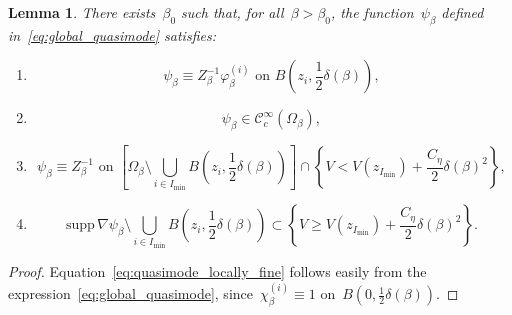 \documentclass[10pt]{article}
\newcommand{\1}{\mathbbm 1}
\newcommand{\supp}{\mathrm{supp}}
\newcommand{\largeRadius}{\delta}
\newcommand{\localCutoff}[1]{\chi_\beta^{(#1)}} %
\newcommand{\energyCutoffConst}{C_\eta}
\newtheorem{lemma}{Lemma}
\begin{document}
            \begin{lemma}
                \label{lemma:qm_energy_estimates}
                There exists~$\beta_0$ such that, for all~$\beta>\beta_0$, the function~$\psi_\beta$ defined in~\eqref{eq:global_quasimode} satisfies:
                \begin{enumerate}[]
                    \item{\begin{equation}\label{eq:quasimode_locally_fine}
                        \psi_\beta \equiv Z_\beta^{-1}\varphi_\beta^{(i)}\text{ on }B\left(z_i,\frac12\largeRadius(\beta)\right),
                    \end{equation}}
                    \item{\begin{equation}\label{eq:quasimode_smooth}
                        \psi_\beta \in \mathcal C_c^\infty(\Omega_\beta),
                    \end{equation}}
                    \item{\begin{equation}\label{eq:quasimode_flat}
                        \psi_\beta \equiv Z_\beta^{-1}\text{ on }\left[\Omega_\beta \setminus \bigcup_{i\in I_{\min}} B\left(z_i,\frac12\largeRadius(\beta)\right)\right] \cap \left\{V < V(z_{I_{\min}}) + \frac{\energyCutoffConst}2\largeRadius(\beta)^2\right\},
                    \end{equation}}
                    \item{\begin{equation}\label{eq:quasimode_high_energy}
                        \supp\,\nabla \psi_\beta \setminus \bigcup_{i\in I_{\min}} B\left(z_i,\frac12\largeRadius(\beta)\right) \subset \left\{ V \geq V(z_{I_{\min}}) + \frac{\energyCutoffConst}2\largeRadius(\beta)^2\right\}.
                    \end{equation}}
                \end{enumerate}
            \end{lemma}
            \begin{proof}
                Equation~\eqref{eq:quasimode_locally_fine} follows easily from the expression~\eqref{eq:global_quasimode}, since~$\localCutoff{i}\equiv 1$ on~${B\left(0,\frac12\largeRadius(\beta)\right)}$.
            \end{proof}
\end{document}
